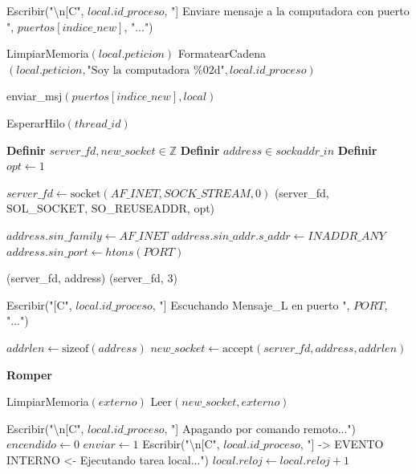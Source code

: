\begin{tcolorbox}[colback=white, colframe=azul_unam, title=Pseudocódigo: cnx\_lamport.c (Conexión P2P), breakable]
\begin{algorithmic}[1]
            \State Escribir("\textbackslash n[C", $local.id\_proceso$, "] Enviare mensaje a la computadora con puerto ", $puertos[indice\_new]$, "...")
            
            \State LimpiarMemoria$(local.peticion)$
            \State FormatearCadena$(local.peticion, \text{"Soy la computadora \%02d"}, local.id\_proceso)$
            
            \State enviar\_msj$(puertos[indice\_new], local)$
        \EndIf
        
    \EndWhile

    \State EsperarHilo$(thread\_id)$

\EndProcedure

\vspace{0.3cm}



    \State \textbf{Definir} $server\_fd, new\_socket \in \mathbb{Z}$
    \State \textbf{Definir} $address \in sockaddr\_in$
    \State \textbf{Definir} $opt \gets 1$

    \State $server\_fd \gets \text{socket}(AF\_INET, SOCK\_STREAM, 0)$
    \State {}(server\_fd, SOL\_SOCKET, SO\_REUSEADDR, opt)

    \State $address.sin\_family \gets AF\_INET$
    \State $address.sin\_addr.s\_addr \gets INADDR\_ANY$
    \State $address.sin\_port \gets htons(PORT)$

    \State {}(server\_fd, address)
    \State {}(server\_fd, 3)

    \State Escribir("[C", $local.id\_proceso$, "] Escuchando Mensaje\_L en puerto ", $PORT$, "...")

        
        \State $addrlen \gets \text{sizeof}(address)$
        \State $new\_socket \gets \text{accept}(server\_fd, address, addrlen)$

            \State \textbf{Romper}
        \EndIf

        \State LimpiarMemoria$(externo)$
        \State Leer$(new\_socket, externo)$

         
            
                \State Escribir("\textbackslash n[C", $local.id\_proceso$, "] Apagando por comando remoto...")
                \State $encendido \gets 0$
                \State $enviar \gets 1$
                \State Escribir("\textbackslash n[C", $local.id\_proceso$, "] -> EVENTO INTERNO <- Ejecutando tarea local...")
                \State $local.reloj \gets local.reloj + 1$
            \EndIf
            

\end{algorithmic}
\end{tcolorbox}
